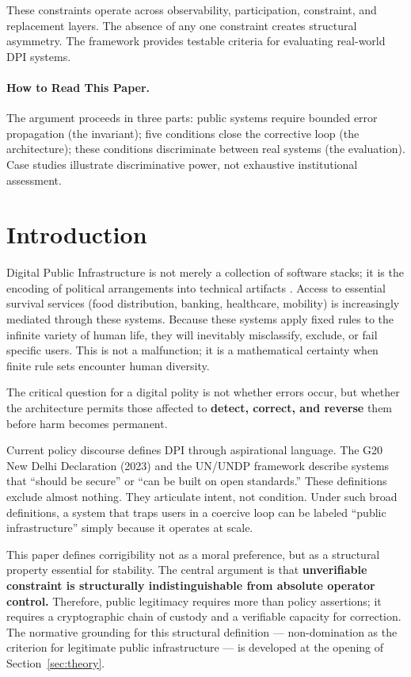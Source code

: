 \documentclass{article}
\begin{document}
These constraints operate across observability, participation, constraint, and replacement layers. The absence of any one constraint creates structural asymmetry. The framework provides testable criteria for evaluating real-world DPI systems.

\paragraph{How to Read This Paper.} The argument proceeds in three parts: public systems require bounded error propagation (the invariant); five conditions close the corrective loop (the architecture); these conditions discriminate between real systems (the evaluation). Case studies illustrate discriminative power, not exhaustive institutional assessment.

\section{Introduction}

Digital Public Infrastructure is not merely a collection of software stacks; it is the encoding of political arrangements into technical artifacts \citep{winner1980}. Access to essential survival services (food distribution, banking, healthcare, mobility) is increasingly mediated through these systems. Because these systems apply fixed rules to the infinite variety of human life, they will inevitably misclassify, exclude, or fail specific users. This is not a malfunction; it is a mathematical certainty when finite rule sets encounter human diversity.

The critical question for a digital polity is not whether errors occur, but whether the architecture permits those affected to \textbf{detect, correct, and reverse} them before harm becomes permanent.

Current policy discourse defines DPI through aspirational language. The G20 New Delhi Declaration (2023) and the UN/UNDP framework \citep{undp} describe systems that ``should be secure'' or ``can be built on open standards.'' These definitions exclude almost nothing. They articulate intent, not condition. Under such broad definitions, a system that traps users in a coercive loop can be labeled ``public infrastructure'' simply because it operates at scale.

This paper defines corrigibility not as a moral preference, but as a structural property essential for stability. The central argument is that \textbf{unverifiable constraint is structurally indistinguishable from absolute operator control.} Therefore, public legitimacy requires more than policy assertions; it requires a cryptographic chain of custody and a verifiable capacity for correction. The normative grounding for this structural definition --- non-domination as the criterion for legitimate public infrastructure --- is developed at the opening of Section~\ref{sec:theory}.
\end{document}
